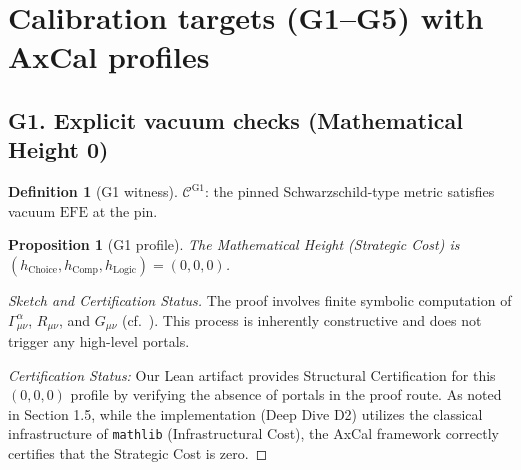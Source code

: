 \documentclass[11pt]{article}
\newtheorem{proposition}[theorem]{Proposition}
\theoremstyle{definition}
\newtheorem{definition}[theorem]{Definition}
\theoremstyle{remark}
\newcommand{\hChoice}{h_{\mathrm{Choice}}}    %
\newcommand{\hComp}{h_{\mathrm{Comp}}}        %
\newcommand{\hLogic}{h_{\mathrm{Logic}}}      %
\newcommand{\EFE}{\mathrm{EFE}} %
\begin{document}
\section{Calibration targets (G1--G5) with AxCal profiles}
\subsection*{G1. Explicit vacuum checks (Mathematical Height 0)}
\begin{definition}[G1 witness]
$\mathcal{C}^{\mathrm{G1}}$: the pinned Schwarzschild-type metric satisfies vacuum $\EFE$ at the pin.
\end{definition}
\begin{proposition}[G1 profile]\label{prop:G1}
The Mathematical Height (Strategic Cost) is $(\hChoice,\hComp,\hLogic)=(0,0,0)$.
\end{proposition}
\begin{proof}[Sketch and Certification Status]
The proof involves finite symbolic computation of $\Gamma^\alpha_{\mu\nu}$, $R_{\mu\nu}$, and $G_{\mu\nu}$ (cf.\ \cite[§B.4]{Wald1984}). This process is inherently constructive and does not trigger any high-level portals.

\emph{Certification Status:} Our Lean artifact provides Structural Certification for this $(0,0,0)$ profile by verifying the absence of portals in the proof route. As noted in Section 1.5, while the implementation (Deep Dive D2) utilizes the classical infrastructure of \texttt{mathlib} (Infrastructural Cost), the AxCal framework correctly certifies that the Strategic Cost is zero.
\end{proof}
\end{document}
